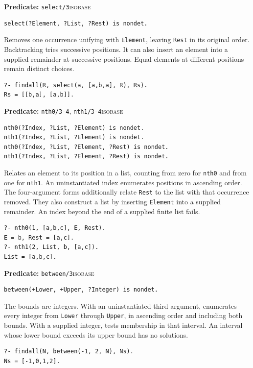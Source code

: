\par{}
\noindent \textbf{Predicate:} \texttt{select/3}\hfill\textsc{isobase}
\begin{verbatim}
select(?Element, ?List, ?Rest) is nondet.
\end{verbatim}
\noindent Removes one occurrence unifying with \texttt{Element}, leaving
\texttt{Rest} in its original order. Backtracking tries successive positions.
It can also insert an element into a supplied remainder at successive positions.
Equal elements at different positions remain distinct choices.
\begin{verbatim}
?- findall(R, select(a, [a,b,a], R), Rs).
Rs = [[b,a], [a,b]].
\end{verbatim}

\par{}
\noindent \textbf{Predicate:} \texttt{nth0/3-4}, \texttt{nth1/3-4}\hfill\textsc{isobase}
\begin{verbatim}
nth0(?Index, ?List, ?Element) is nondet.
nth1(?Index, ?List, ?Element) is nondet.
nth0(?Index, ?List, ?Element, ?Rest) is nondet.
nth1(?Index, ?List, ?Element, ?Rest) is nondet.
\end{verbatim}
\noindent Relates an element to its position in a list, counting from zero for
\texttt{nth0} and from one for \texttt{nth1}. An uninstantiated index enumerates
positions in ascending order. The four-argument forms additionally relate
\texttt{Rest} to the list with that occurrence removed. They also construct a
list by inserting \texttt{Element} into a supplied remainder. An index beyond
the end of a supplied finite list fails.
\begin{verbatim}
?- nth0(1, [a,b,c], E, Rest).
E = b, Rest = [a,c].
?- nth1(2, List, b, [a,c]).
List = [a,b,c].
\end{verbatim}

\par{}
\noindent \textbf{Predicate:} \texttt{between/3}\hfill\textsc{isobase}
\begin{verbatim}
between(+Lower, +Upper, ?Integer) is nondet.
\end{verbatim}
\noindent The bounds are integers. With an uninstantiated third argument,
enumerates every integer from \texttt{Lower} through \texttt{Upper}, in
ascending order and including both bounds. With a supplied integer, tests
membership in that interval. An interval whose lower bound exceeds its upper
bound has no solutions.
\begin{verbatim}
?- findall(N, between(-1, 2, N), Ns).
Ns = [-1,0,1,2].
\end{verbatim}

